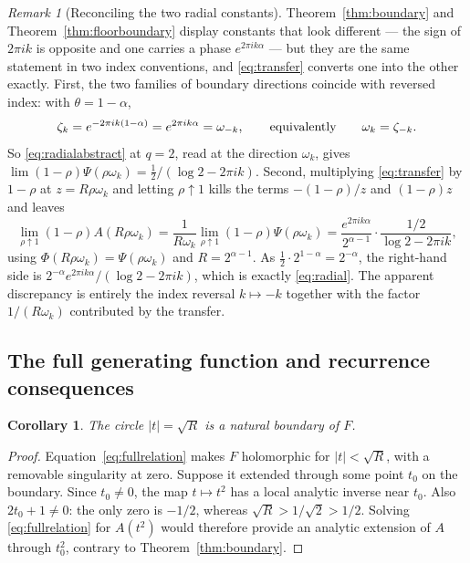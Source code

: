 \documentclass[11pt,letterpaper]{article}
\numberwithin{equation}{section}
\newtheorem{corollary}[theorem]{Corollary}
\theoremstyle{definition}
\theoremstyle{remark}
\newtheorem{remark}[theorem]{Remark}
\begin{document}
\begin{remark}[Reconciling the two radial constants]\label{rem:reconcile}
Theorem~\ref{thm:boundary} and Theorem~\ref{thm:floorboundary} display
constants that look different --- the sign of $2\pi ik$ is opposite and one
carries a phase $e^{2\pi ik\alpha}$ --- but they are the same statement in
two index conventions, and \eqref{eq:transfer} converts one into the other
exactly. First, the two families of boundary directions coincide with
reversed index: with $\theta=1-\alpha$,
\[
 \zeta_k=e^{-2\pi ik(1-\alpha)}=e^{2\pi ik\alpha}=\omega_{-k},
 \qquad\hbox{equivalently}\qquad \omega_k=\zeta_{-k}.
\]
So \eqref{eq:radialabstract} at $q=2$, read at the direction $\omega_k$,
gives $\lim(1-\rho)\Psi(\rho\omega_k)=\tfrac12/(\log2-2\pi ik)$. Second,
multiplying \eqref{eq:transfer} by $1-\rho$ at $z=R\rho\omega_k$ and letting
$\rho\uparrow1$ kills the terms $-(1-\rho)/z$ and $(1-\rho)z$ and leaves
\[
 \lim_{\rho\uparrow1}(1-\rho)A(R\rho\omega_k)
 =\frac1{R\omega_k}\lim_{\rho\uparrow1}(1-\rho)\Psi(\rho\omega_k)
 =\frac{e^{2\pi ik\alpha}}{2^{\alpha-1}}\cdot\frac{1/2}{\log2-2\pi ik},
\]
using $\Phi(R\rho\omega_k)=\Psi(\rho\omega_k)$ and $R=2^{\alpha-1}$. As
$\tfrac12\cdot2^{1-\alpha}=2^{-\alpha}$, the right-hand side is
$2^{-\alpha}e^{2\pi ik\alpha}/(\log2-2\pi ik)$, which is exactly
\eqref{eq:radial}. The apparent discrepancy is entirely the index reversal
$k\mapsto-k$ together with the factor $1/(R\omega_k)$ contributed by the
transfer.
\end{remark}

\subsection{The full generating function and recurrence consequences}
\begin{corollary}\label{cor:fullboundary}
The circle $|t|=\sqrt R$ is a natural boundary of $F$.
\end{corollary}
\begin{proof}
Equation~\eqref{eq:fullrelation} makes $F$ holomorphic for
$|t|<\sqrt R$, with a removable singularity at zero. Suppose it extended
through some point $t_0$ on the boundary. Since $t_0\ne0$, the map
$t\mapsto t^2$ has a local analytic inverse near $t_0$. Also
$2t_0+1\ne0$: the only zero is $-1/2$, whereas
$\sqrt R>1/\sqrt2>1/2$. Solving \eqref{eq:fullrelation} for $A(t^2)$ would
therefore provide an analytic extension of $A$ through $t_0^2$, contrary
to Theorem~\ref{thm:boundary}.
\end{proof}
\end{document}
